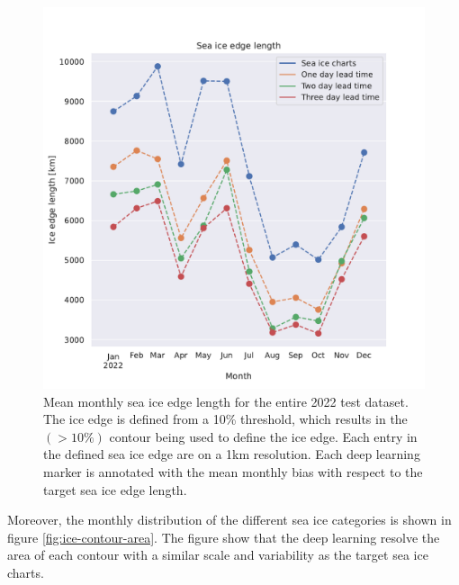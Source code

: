 \documentclass[../main/thesis.tex]{subfiles}
\begin{document}
\begin{figure}
    \centering
    \includegraphics[width=\textwidth]{ice_edge_length}
    \caption{\label{fig:ice-edge-length}Mean monthly sea ice edge length for the entire 2022 test dataset. The ice edge is defined from a 10\% threshold, which results in the $(> 10\%)$ contour being used to define the ice edge. Each entry in the defined sea ice edge are on a 1km resolution. Each deep learning marker is annotated with the mean monthly bias with respect to the target sea ice edge length.}
\end{figure}

Moreover, the monthly distribution of the different sea ice categories is shown in figure \ref{fig:ice-contour-area}. The figure show that the deep learning resolve the area of each contour with a similar scale and variability as the target sea ice charts. 
\end{document}
